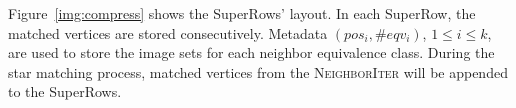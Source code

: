 Figure~\ref{img:compress} shows the SuperRows' layout.
In each SuperRow, the matched vertices are stored consecutively.
Metadata $(pos_i, \#eqv_i)$, $ 1 \le i \le k$, are used to store the image sets for each neighbor equivalence class.
During the star matching process, matched vertices from the \textsc{NeighborIter} will be appended to the SuperRows.




